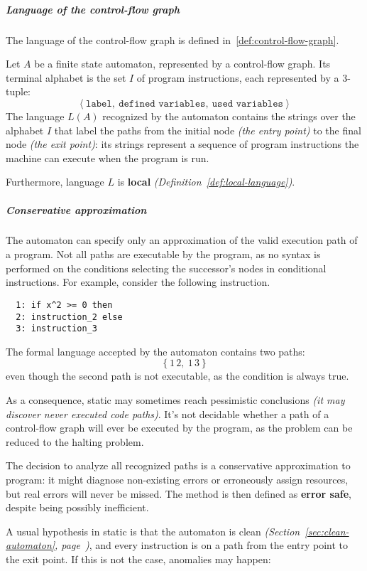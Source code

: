\documentclass[english]{article}
\begin{document}
\subparagraph*{Language of the control-flow graph}
The language of the control-flow graph is defined in~\ref{def:control-flow-graph}.

\begin{definition}
  \label{def:control-flow-graph}
  Let \(A\) be a finite state automaton, represented by a control-flow graph.
  Its terminal alphabet is the set \(I\) of program instructions, each represented by a \(3\)-tuple:
  \[ \left\langle \texttt{label},\ \texttt{defined variables},\ \texttt{used variables} \right\rangle \]
  The language \(L(A)\) recognized by the automaton contains the strings over the alphabet \(I\) that label the paths from the initial node \textit{(the entry point)} to the final node \textit{(the exit point)}:
  its strings represent a sequence of program instructions the machine can execute when the program is run.
\end{definition}

Furthermore, language \(L\) is \textbf{local} \textit{(Definition~\ref{def:local-language})}.

\subparagraph*{Conservative approximation}

The automaton can specify only an approximation of the valid execution path of a program.
Not all paths are executable by the program, as no syntax  is performed on the conditions selecting the successor's nodes in conditional instructions.
For example, consider the following instruction.
\begin{verbatim}
  1: if x^2 >= 0 then
  2: instruction_2 else
  3: instruction_3
\end{verbatim}
The formal language accepted by the automaton contains two paths:
\[ \left\{ 1 \, 2, \ 1 \, 3 \right\} \]
even though the second path is not executable, as the condition is always true.

As a consequence, static  may sometimes reach pessimistic conclusions \textit{(it may discover never executed code paths)}.
It's not decidable whether a path of a control-flow graph will ever be executed by the program, as the problem can be reduced to the halting problem.

The decision to analyze all recognized paths is a conservative approximation to program:
it might diagnose non-existing errors or erroneously assign resources, but real errors will never be missed.
The method is then defined as \textbf{error safe}, despite being possibly inefficient.

A usual hypothesis in static  is that the automaton is clean \textit{(Section~\ref{sec:clean-automaton}, page~\pageref{sec:clean-automaton})}, and every instruction is on a path from the entry point to the exit point.
If this is not the case, anomalies may happen:
\end{document}
